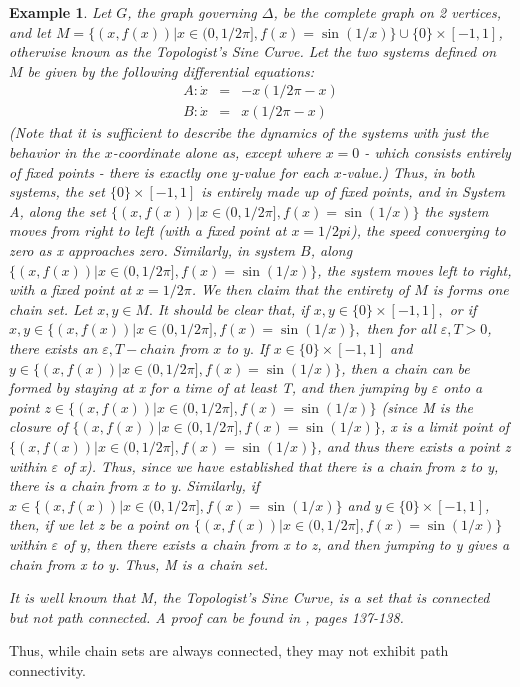 \documentclass[11pt]{article}
\newtheorem{ex}[thm]{Example}
\begin{document}
\begin{ex}
Let $G$, the graph governing $\Delta$, be the complete graph on 2 vertices, and let $M=\{(x,f(x))| x\in(0,1/2\pi], f(x)=\sin(1/x)\}\cup\{0\}\times[-1,1]$, otherwise known as the Topologist's Sine Curve.   Let the two systems defined on $M$ be given by the following differential equations:
\begin{eqnarray}
A: \dot{x}&=&-x(1/2\pi-x)\\
B: \dot{x}&=&x(1/2\pi-x)
\end{eqnarray}
(Note that it is sufficient to describe the dynamics of the systems with just the behavior in the $x$-coordinate alone as, except where $x=0$ - which consists entirely of fixed points - there is exactly one $y$-value for each $x$-value.) Thus, in both systems, the set $\{0\}\times[-1,1]$ is entirely made up of fixed points, and in System A, along the set $\{(x,f(x))| x\in(0,1/2\pi], f(x)=\sin(1/x)\}$ the system moves from right to left (with a fixed point at $x=1/2pi$), the speed converging to zero as x approaches zero.  Similarly, in system $B$, along $\{(x,f(x))| x\in(0,1/2\pi], f(x)=\sin(1/x)\}$, the system moves left to right, with a fixed point at $x=1/2\pi$.  We then claim that the entirety of $M$ is forms one chain set.  
Let $x,y \in M.$ It should be clear that, if $x,y \in \{0\} \times [-1,1],$ or if $x,y \in \{(x,f(x))|x \in (0,1/2\pi],f(x)= \sin(1/x)\},$ then for all $\varepsilon,T > 0 $, there exists an $\varepsilon,T-chain$ from $x$ to $y.$ If $x \in \{0\}\times [-1,1]$ and $y \in \{(x,f(x))|x \in (0,1/2\pi],f(x) = \sin(1/x)\}$, then a chain can be formed by staying at x for a time of at least T, and then jumping by $\varepsilon$ onto a point $z \in \{(x,f(x))|x \in(0, 1/2\pi], f (x) = \sin(1/x)\}$ (since M is the closure of $\{(x, f (x))|x \in (0, 1/2\pi], f (x) = \sin(1/x)\}$, x is a limit point of  $\{(x,f(x))|x \in(0,1/2\pi],f(x) = \sin(1/x)\}$, and thus there exists a point z within $\varepsilon$ of x). Thus, since we have established that there is a chain from z to y, there is a chain from x to y. Similarly, if $x\in \{(x, f (x))|x \in (0, 1/2\pi], f (x) = \sin(1/x)\}$ and $y \in \{0\} \times [-1, 1]$, then, if we let z be a point on $\{(x, f (x))|x \in (0, 1/2\pi], f (x) = \sin(1/x)\}$ within $\varepsilon$ of y, then there exists a chain from x to z, and then jumping to y gives a chain from x to y. Thus, M is a chain set.

It is well known that M, the Topologist's Sine Curve, is a set that is connected but not path connected. A proof can be found in \cite{counterexamples}, pages 137-138.
\end{ex}
\noindent Thus, while chain sets are always connected, they may not exhibit path connectivity.  \\
\end{document}
